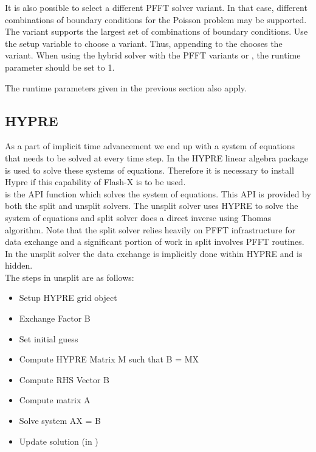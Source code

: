 It is also possible to select a different PFFT solver variant. In that case,
different combinations of boundary conditions for the Poisson problem may be
supported. 
The  variant supports the largest set of
combinations of boundary conditions.
Use the  setup variable to choose a variant.
Thus, appending  to the 
chooses the  variant.
When using the hybrid solver with the PFFT variants  or
,
the runtime parameter  should be set to 1.


The  runtime parameters given in the previous section also apply.


\subsection {HYPRE}
As a part of implicit time advancement we end up with a system of equations that needs to be solved at every time 
step. In \flashx the HYPRE linear algebra package is used to solve
these systems of equations. Therefore it is necessary to install Hypre
if this capability of Flash-X is to be used.\\

 is the API function which solves the system of equations. This API is provided by both
the split and unsplit solvers. The unsplit solver uses HYPRE to solve the system of equations and split solver does
a direct inverse using Thomas algorithm. Note that the split solver relies heavily on PFFT infrastructure
for data exchange and a significant portion of work in split  involves PFFT routines. In the 
unsplit solver the data exchange is implicitly done within HYPRE and is hidden. \\

The steps in unsplit  are as follows:
\begin{itemize}
\item {Setup HYPRE grid object}
\item {Exchange Factor B}
\item {Set initial guess}
\item {Compute HYPRE Matrix M such that B = MX}
\item {Compute RHS Vector B}
\item {Compute matrix A}
\item {Solve system AX = B}
\item {Update solution (in \flashx)} \\
\end{itemize} 

